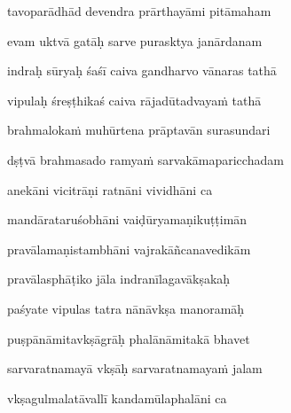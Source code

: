tavoparādhād devendra prārthayāmi pitāmaham\thinspace{\dandab} \dontdisplaylinenum

evam uktvā gatāḥ sarve purasktya janārdanam \veg\dontdisplaylinenum
{}

indraḥ sūryaḥ śaśī caiva gandharvo vānaras tathā\thinspace{\dandab} \dontdisplaylinenum

vipulaḥ śreṣṭhikaś caiva rājadūtadvayaṁ tathā \veg\dontdisplaylinenum
{}

brahmalokaṁ muhūrtena prāptavān surasundari\thinspace{\dandab} \dontdisplaylinenum

dṣṭvā brahmasado ramyaṁ sarvakāmaparicchadam \veg\dontdisplaylinenum
{}

anekāni vicitrāṇi ratnāni vividhāni ca\thinspace{\dandab} \dontdisplaylinenum

mandārataruśobhāni vaiḍūryamaṇikuṭṭimān \veg\dontdisplaylinenum
{}

pravālamaṇistambhāni vajrakāñcanavedikām\thinspace{\dandab} \dontdisplaylinenum

pravālasphāṭiko jāla indranīlagavākṣakaḥ \veg\dontdisplaylinenum
{}

paśyate vipulas tatra nānāvkṣa manoramāḥ\thinspace{\dandab} \dontdisplaylinenum

puṣpānāmitavkṣāgrāḥ phalānāmitakā bhavet \veg\dontdisplaylinenum
{}

sarvaratnamayā vkṣāḥ sarvaratnamayaṁ jalam\thinspace{\dandab} \dontdisplaylinenum

vkṣagulmalatāvallī kandamūlaphalāni ca \veg\dontdisplaylinenum
{}

